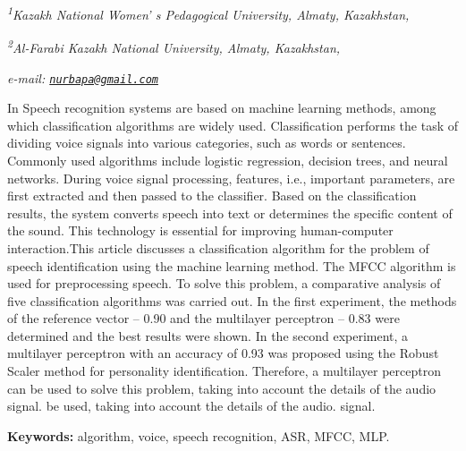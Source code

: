 \begin{affiliation}
{\em \textsuperscript{1}Kazakh National Women' s Pedagogical University, Almaty, Kazakhstan,}

{\em \textsuperscript{2}Al-Farabi Kazakh National University, Almaty, Kazakhstan,}

{\em e-mail: \href{mailto:nurbapa@gmail.com}{\nolinkurl{nurbapa@gmail.com}}}
\end{affiliation}

In Speech recognition systems are based on machine learning methods,
among which classification algorithms are widely used. Classification
performs the task of dividing voice signals into various categories,
such as words or sentences. Commonly used algorithms include logistic
regression, decision trees, and neural networks. During voice signal
processing, features, i.e., important parameters, are first extracted
and then passed to the classifier. Based on the classification results,
the system converts speech into text or determines the specific content
of the sound. This technology is essential for improving human-computer
interaction.This article discusses a classification algorithm for the
problem of speech identification using the machine learning method. The
MFCC algorithm is used for preprocessing speech. To solve this problem,
a comparative analysis of five classification algorithms was carried
out. In the first experiment, the methods of the reference vector --
0.90 and the multilayer perceptron -- 0.83 were determined and the best
results were shown. In the second experiment, a multilayer perceptron
with an accuracy of 0.93 was proposed using the Robust Scaler method for
personality identification. Therefore, a multilayer perceptron can be
used to solve this problem, taking into account the details of the audio
signal. be used, taking into account the details of the audio. signal.

{\bfseries Keywords:} algorithm, voice, speech recognition, ASR, MFCC, MLP.

